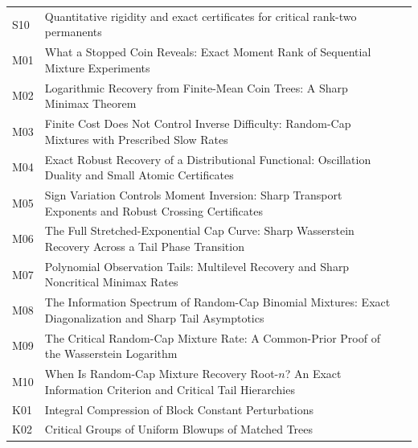 \documentclass[11pt,a4paper]{article}
\theoremstyle{definition}\newtheorem{definition}[theorem]{Definition}
\theoremstyle{remark}\newtheorem{remark}[theorem]{Remark}
\numberwithin{equation}{section}
\begin{document}
\begin{longtable}{@{}p{}p{}r@{}}
S10 & Quantitative rigidity and exact certificates for critical rank-two permanents & \pageref{contrib-S10}\\

M01 & What a Stopped Coin Reveals: Exact Moment Rank of Sequential Mixture Experiments & \pageref{contrib-M01}\\

M02 & Logarithmic Recovery from Finite-Mean Coin Trees: A Sharp Minimax Theorem & \pageref{contrib-M02}\\

M03 & Finite Cost Does Not Control Inverse Difficulty: Random-Cap Mixtures with Prescribed Slow Rates & \pageref{contrib-M03}\\

M04 & Exact Robust Recovery of a Distributional Functional: Oscillation Duality and Small Atomic Certificates & \pageref{contrib-M04}\\

M05 & Sign Variation Controls Moment Inversion: Sharp Transport Exponents and Robust Crossing Certificates & \pageref{contrib-M05}\\

M06 & The Full Stretched-Exponential Cap Curve: Sharp Wasserstein Recovery Across a Tail Phase Transition & \pageref{contrib-M06}\\

M07 & Polynomial Observation Tails: Multilevel Recovery and Sharp Noncritical Minimax Rates & \pageref{contrib-M07}\\

M08 & The Information Spectrum of Random-Cap Binomial Mixtures: Exact Diagonalization and Sharp Tail Asymptotics & \pageref{contrib-M08}\\

M09 & The Critical Random-Cap Mixture Rate: A Common-Prior Proof of the Wasserstein Logarithm & \pageref{contrib-M09}\\

M10 & When Is Random-Cap Mixture Recovery Root-\texorpdfstring{$n$}{n}? An Exact Information Criterion and Critical Tail Hierarchies & \pageref{contrib-M10}\\

K01 & Integral Compression of Block Constant Perturbations & \pageref{contrib-K01}\\

K02 & Critical Groups of Uniform Blowups of Matched Trees & \pageref{contrib-K02}\\


\end{longtable}
\end{document}
